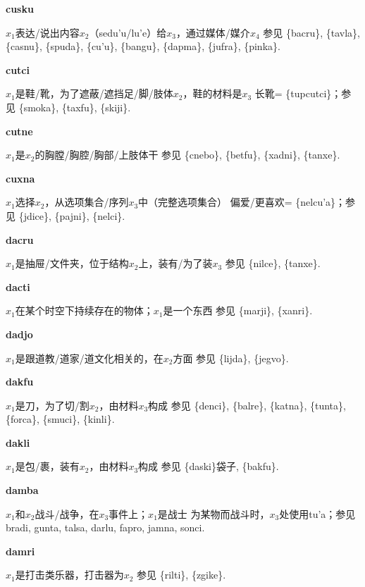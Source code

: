 \documentclass[notitlepage,twocolumn,a4paper,10pt]{book}
\begin{document}
{\sffamily\bfseries cusku}  $x_1$表达\slash{}说出内容$x_2$（sedu'u\slash{}lu'e）给$x_3$，通过媒体\slash{}媒介$x_4$ \textemdash{} 参见 \{bacru\}, \{tavla\}, \{casnu\}, \{spuda\}, \{cu'u\}, \{bangu\}, \{dapma\}, \{jufra\}, \{pinka\}.

{\sffamily\bfseries cutci}\enspace {\ttfamily\bfseries[cuc]}  $x_1$是鞋\slash{}靴，为了遮蔽\slash{}遮挡足\slash{}脚\slash{}肢体$x_2$，鞋的材料是$x_3$ \textemdash{} 长靴= \{tupcutci\}；参见 \{smoka\}, \{taxfu\}, \{skiji\}.

{\sffamily\bfseries cutne}\enspace {\ttfamily\bfseries[cut]}  $x_1$是$x_2$的胸膛\slash{}胸腔\slash{}胸部\slash{}上肢体干 \textemdash{} 参见 \{cnebo\}, \{betfu\}, \{xadni\}, \{tanxe\}.

{\sffamily\bfseries cuxna}\enspace {\ttfamily\bfseries[cux     cu'a]}  $x_1$选择$x_2$，从选项集合\slash{}序列$x_3$中（完整选项集合） \textemdash{} 偏爱\slash{}更喜欢= \{nelcu'a\}；参见 \{jdice\}, \{pajni\}, \{nelci\}.

{\sffamily\bfseries dacru}\enspace {\ttfamily\bfseries[dac]}  $x_1$是抽屉\slash{}文件夹，位于结构$x_2$上，装有\slash{}为了装$x_3$ \textemdash{} 参见 \{nilce\}, \{tanxe\}.

{\sffamily\bfseries dacti}\enspace {\ttfamily\bfseries[        dai]}  $x_1$在某个时空下持续存在的物体；$x_1$是一个东西 \textemdash{} 参见 \{marji\}, \{xanri\}.

{\sffamily\bfseries dadjo}\enspace {\ttfamily\bfseries[daj]}  $x_1$是跟道教\slash{}道家\slash{}道文化相关的，在$x_2$方面 \textemdash{} 参见 \{lijda\}, \{jegvo\}.

{\sffamily\bfseries dakfu}\enspace {\ttfamily\bfseries[dak]}  $x_1$是刀，为了切\slash{}割$x_2$，由材料$x_3$构成 \textemdash{} 参见 \{denci\}, \{balre\}, \{katna\}, \{tunta\}, \{forca\}, \{smuci\}, \{kinli\}.

{\sffamily\bfseries dakli} $x_1$是包\slash{}裹，装有$x_2$，由材料$x_3$构成 \textemdash{} 参见 \{daski\}袋子, \{bakfu\}.

{\sffamily\bfseries damba}\enspace {\ttfamily\bfseries[dab     da'a]}  $x_1$和$x_2$战斗\slash{}战争，在$x_3$事件上；$x_1$是战士 \textemdash{} 为某物而战斗时，$x_3$处使用tu'a；参见 {bradi}, {gunta}, {talsa}, {darlu}, {fapro}, {jamna}, {sonci}.

{\sffamily\bfseries damri} $x_1$是打击类乐器，打击器为$x_2$ \textemdash{} 参见 \{rilti\}, \{zgike\}.
\end{document}
